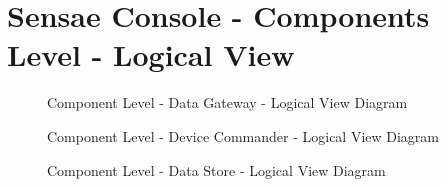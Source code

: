 \chapter{Sensae Console - Components Level - Logical View}
\label{AppendixC}

\begin{figure}[H]
   \centering
   \resizebox{0.75\columnwidth}{!}
   {
      
   }
   \caption[Component Level - Data Gateway - Logical View Diagram]{Component Level - Data Gateway - Logical View Diagram}
   \label{fig:AppendixC:gateway}
\end{figure}

\begin{figure}[H]
   \centering
   \resizebox{0.75\columnwidth}{!}
   {
      
   }
   \caption[Component Level - Device Commander - Logical View Diagram]{Component Level - Device Commander - Logical View Diagram}
   \label{fig:AppendixC:commander}
\end{figure}

\begin{figure}[H]
   \centering
   \resizebox{0.75\columnwidth}{!}
   {
      
   }
   \caption[Component Level - Data Store - Logical View Diagram]{Component Level - Data Store - Logical View Diagram}
   \label{fig:AppendixC:store}
\end{figure}
